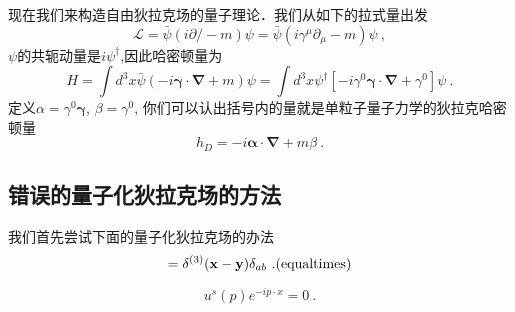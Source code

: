 
现在我们来构造自由狄拉克场的量子理论．我们从如下的拉式量出发
\begin{equation}
\mathcal L = \bar \psi (i \partial\!\!\!/ - m)\psi = \bar \psi (i \gamma^\mu \partial_\mu - m)\psi~,
\end{equation}
$\psi$的共轭动量是$i\psi^\dagger$,因此哈密顿量为
\begin{equation}
H = \int d^3 x \bar \psi (-i \boldsymbol \gamma \cdot \boldsymbol \nabla + m)\psi = \int d^3 x \psi^\dagger [-i\gamma^0\boldsymbol\gamma \cdot \boldsymbol\nabla + \gamma^0]\psi ~.
\end{equation}
定义$\alpha = \gamma^0 \boldsymbol\gamma$, $\beta = \gamma^0$, 你们可以认出括号内的量就是单粒子量子力学的狄拉克哈密顿量
\begin{equation}
h_D = - i \boldsymbol\alpha \cdot \boldsymbol \nabla + m \beta ~.
\end{equation} 

\subsection{错误的量子化狄拉克场的方法}
我们首先尝试下面的量子化狄拉克场的办法
\begin{equation}
[\psi_a(\mathbf x),\psi_b^\dagger(\mathbf y)] = \delta^{(3)}(\mathbf x - \mathbf y)\delta_{ab}~. {\rm (equal times)}
\end{equation}

\begin{equation}
[i\gamma^0\partial_0+i\boldsymbol \gamma \cdot \nabla - m ] u^s (p) e^{-ip\cdot x} = 0~.
\end{equation}








